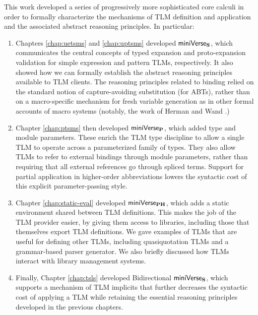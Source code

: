 This work developed a series of progressively more sophisticated core calculi in order to formally characterize the mechanisms of TLM definition and application and the associated abstract reasoning principles. In particular:
\begin{enumerate}
\item Chapters \ref{chap:uetsms} and \ref{chap:uptsms} developed $\mathsf{miniVerse}_\textbf{S}$, which communicates the central concepts of typed expansion and proto-expansion validation for simple expression and pattern TLMs, respectively. It also showed how we can formally establish the abstract reasoning principles available to TLM clients. The reasoning principles related to binding relied on the standard notion of capture-avoiding substitution (for ABTs), rather than on a macro-specific mechanism for fresh variable generation as in other formal accounts of macro systems (notably, the work of Herman and Wand \cite{Herman10:Theory,DBLP:conf/esop/HermanW08}.) 

\item Chapter \ref{chap:ptsms} then developed $\mathsf{miniVerse}_\textbf{P}$, which added type and module parameters. These enrich the TLM type discipline to allow a single TLM to operate across a parameterized family of types. They also allow TLMs to refer to external bindings through module parameters, rather than requiring that all external references go through spliced terms. Support for partial application in higher-order abbreviations lowers the syntactic cost of this explicit parameter-passing style. 

\item Chapter \ref{chap:static-eval} developed $\mathsf{miniVerse}_\textbf{PH}$, which adds a static environment shared between TLM definitions. This makes the job of the TLM provider easier, by giving them access to libraries, including those that themselves export TLM definitions. We gave examples of TLMs that are useful for defining other TLMs, including quasiquotation TLMs and a grammar-based parser generator. We also briefly discussed how TLMs interact with library management systems.

\item Finally, Chapter \ref{chap:tsls} developed Bidirectional $\mathsf{miniVerse}_\textbf{S}$, which supports a mechanism of TLM implicits that further decreases the syntactic cost of applying a TLM while retaining the essential reasoning principles developed in the previous chapters.
\end{enumerate}

\vspace{-10px}
